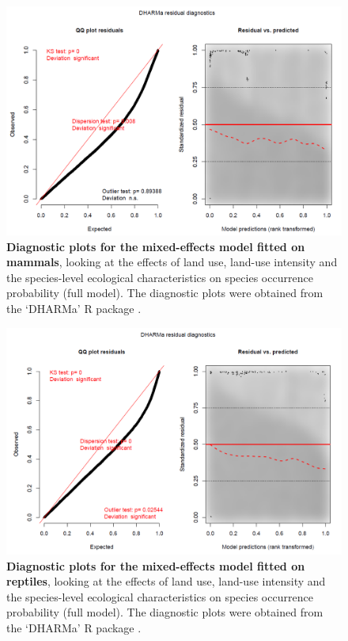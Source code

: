 \begin{figure}[h!]
\centering
\includegraphics[scale=0.5]{Supporting/Chapter4/Figures/LU_Diag_mammals.png}
\caption[Land-use responses: diagnostic plots for the mixed-effects model fitted on mammals]{\textbf{Diagnostic plots for the mixed-effects model fitted on mammals}, looking at the effects of land use, land-use intensity and the species-level ecological characteristics on species occurrence probability (full model). The diagnostic plots were obtained from the `DHARMa' R package \citep{DHARMa}.}
\label{SI_4_Figure14}
\end{figure}

\begin{figure}[h!]
\centering
\includegraphics[scale=0.5]{Supporting/Chapter4/Figures/LU_Diag_reptiles.png}
\caption[Land-use responses: diagnostic plots for the mixed-effects model fitted on reptiles]{\textbf{Diagnostic plots for the mixed-effects model fitted on reptiles}, looking at the effects of land use, land-use intensity and the species-level ecological characteristics on species occurrence probability (full model). The diagnostic plots were obtained from the `DHARMa' R package \citep{DHARMa}.}
\label{SI_4_Figure15}
\end{figure}

